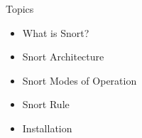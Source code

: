 \begin{frame}[t]{Topics}
  \fontsize{17}{20.5}\selectfont
  \vspace{0.2cm}
  \begin{itemize}
    \item What is Snort?
    \item Snort Architecture
    \item Snort Modes of Operation
    \item Snort Rule
    \item Installation
  \end{itemize}
\end{frame}
